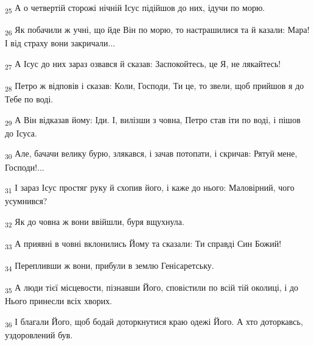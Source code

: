 \begin{tcolorbox}
\textsubscript{25} А о четвертій сторожі нічній Ісус підійшов до них, ідучи по морю.
\end{tcolorbox}
\begin{tcolorbox}
\textsubscript{26} Як побачили ж учні, що йде Він по морю, то настрашилися та й казали: Мара! І від страху вони закричали...
\end{tcolorbox}
\begin{tcolorbox}
\textsubscript{27} А Ісус до них зараз озвався й сказав: Заспокойтесь, це Я, не лякайтесь!
\end{tcolorbox}
\begin{tcolorbox}
\textsubscript{28} Петро ж відповів і сказав: Коли, Господи, Ти це, то звели, щоб прийшов я до Тебе по воді.
\end{tcolorbox}
\begin{tcolorbox}
\textsubscript{29} А Він відказав йому: Іди. І, вилізши з човна, Петро став іти по воді, і пішов до Ісуса.
\end{tcolorbox}
\begin{tcolorbox}
\textsubscript{30} Але, бачачи велику бурю, злякався, і зачав потопати, і скричав: Рятуй мене, Господи!...
\end{tcolorbox}
\begin{tcolorbox}
\textsubscript{31} І зараз Ісус простяг руку й схопив його, і каже до нього: Маловірний, чого усумнився?
\end{tcolorbox}
\begin{tcolorbox}
\textsubscript{32} Як до човна ж вони ввійшли, буря вщухнула.
\end{tcolorbox}
\begin{tcolorbox}
\textsubscript{33} А приявні в човні вклонились Йому та сказали: Ти справді Син Божий!
\end{tcolorbox}
\begin{tcolorbox}
\textsubscript{34} Перепливши ж вони, прибули в землю Генісаретську.
\end{tcolorbox}
\begin{tcolorbox}
\textsubscript{35} А люди тієї місцевости, пізнавши Його, сповістили по всій тій околиці, і до Нього принесли всіх хворих.
\end{tcolorbox}
\begin{tcolorbox}
\textsubscript{36} І благали Його, щоб бодай доторкнутися краю одежі Його. А хто доторкавсь, уздоровлений був.
\end{tcolorbox}
